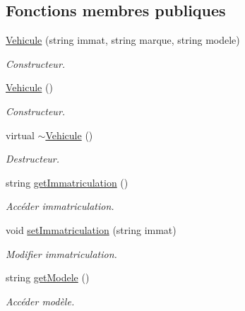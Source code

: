 \subsection*{Fonctions membres publiques}
\begin{DoxyCompactItemize}
\item 
\hyperlink{class_vehicule_aee00431f40bef336c741264f31d32949}{Vehicule} (string immat, string marque, string modele)
\begin{DoxyCompactList}\small\item\em Constructeur. \item\end{DoxyCompactList}\item 
\hyperlink{class_vehicule_ac9352572d0ca9cd4d3138247842c4ce8}{Vehicule} ()
\begin{DoxyCompactList}\small\item\em Constructeur. \item\end{DoxyCompactList}\item 
virtual \hyperlink{class_vehicule_af35800a1c217e3d39e91801932cc35ba}{$\sim$Vehicule} ()
\begin{DoxyCompactList}\small\item\em Destructeur. \item\end{DoxyCompactList}\item 
string \hyperlink{class_vehicule_a5be9ca3e75797e8009f1c9a8bd6f0f58}{getImmatriculation} ()
\begin{DoxyCompactList}\small\item\em Accéder immatriculation. \item\end{DoxyCompactList}\item 
void \hyperlink{class_vehicule_a8a70b407fbeb7cc7359d4c5cc4a11150}{setImmatriculation} (string immat)
\begin{DoxyCompactList}\small\item\em Modifier immatriculation. \item\end{DoxyCompactList}\item 
string \hyperlink{class_vehicule_a61fd72adc19ab2aaa08e3a36775f27ba}{getModele} ()
\begin{DoxyCompactList}\small\item\em Accéder modèle. \item\end{DoxyCompactList}\item 

\end{DoxyCompactItemize}
